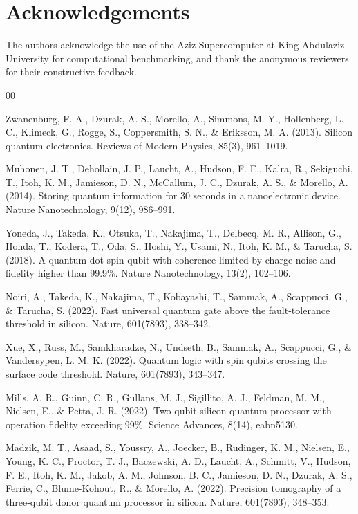 \documentclass[preprint,12pt, a4paper]{elsarticle}
\begin{document}
\section*{Acknowledgements}
The authors acknowledge the use of the Aziz Supercomputer at King Abdulaziz University for computational benchmarking, and thank the anonymous reviewers for their constructive feedback.

\begin{thebibliography}{00}

 Zwanenburg, F. A., Dzurak, A. S., Morello, A., Simmons, M. Y., Hollenberg, L. C., Klimeck, G., Rogge, S., Coppersmith, S. N., \& Eriksson, M. A. (2013). Silicon quantum electronics. Reviews of Modern Physics, 85(3), 961--1019.

 Muhonen, J. T., Dehollain, J. P., Laucht, A., Hudson, F. E., Kalra, R., Sekiguchi, T., Itoh, K. M., Jamieson, D. N., McCallum, J. C., Dzurak, A. S., \& Morello, A. (2014). Storing quantum information for 30 seconds in a nanoelectronic device. Nature Nanotechnology, 9(12), 986--991.

 Yoneda, J., Takeda, K., Otsuka, T., Nakajima, T., Delbecq, M. R., Allison, G., Honda, T., Kodera, T., Oda, S., Hoshi, Y., Usami, N., Itoh, K. M., \& Tarucha, S. (2018). A quantum-dot spin qubit with coherence limited by charge noise and fidelity higher than 99.9\%. Nature Nanotechnology, 13(2), 102--106.

 Noiri, A., Takeda, K., Nakajima, T., Kobayashi, T., Sammak, A., Scappucci, G., \& Tarucha, S. (2022). Fast universal quantum gate above the fault-tolerance threshold in silicon. Nature, 601(7893), 338--342.

 Xue, X., Russ, M., Samkharadze, N., Undseth, B., Sammak, A., Scappucci, G., \& Vandersypen, L. M. K. (2022). Quantum logic with spin qubits crossing the surface code threshold. Nature, 601(7893), 343--347.

 Mills, A. R., Guinn, C. R., Gullans, M. J., Sigillito, A. J., Feldman, M. M., Nielsen, E., \& Petta, J. R. (2022). Two-qubit silicon quantum processor with operation fidelity exceeding 99\%. Science Advances, 8(14), eabn5130.

 Madzik, M. T., Asaad, S., Youssry, A., Joecker, B., Rudinger, K. M., Nielsen, E., Young, K. C., Proctor, T. J., Baczewski, A. D., Laucht, A., Schmitt, V., Hudson, F. E., Itoh, K. M., Jakob, A. M., Johnson, B. C., Jamieson, D. N., Dzurak, A. S., Ferrie, C., Blume-Kohout, R., \& Morello, A. (2022). Precision tomography of a three-qubit donor quantum processor in silicon. Nature, 601(7893), 348--353.


\end{thebibliography}
\end{document}
